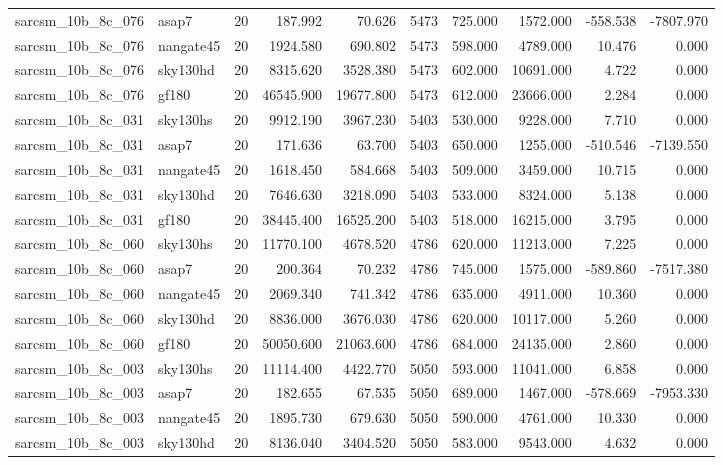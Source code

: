 \begin{tabular}{llrrrrrrrr}
sarcsm\_10b\_8c\_076 & asap7 & 20 & 187.992 & 70.626 & 5473 & 725.000 & 1572.000 & -558.538 & -7807.970 \\
sarcsm\_10b\_8c\_076 & nangate45 & 20 & 1924.580 & 690.802 & 5473 & 598.000 & 4789.000 & 10.476 & 0.000 \\
sarcsm\_10b\_8c\_076 & sky130hd & 20 & 8315.620 & 3528.380 & 5473 & 602.000 & 10691.000 & 4.722 & 0.000 \\
sarcsm\_10b\_8c\_076 & gf180 & 20 & 46545.900 & 19677.800 & 5473 & 612.000 & 23666.000 & 2.284 & 0.000 \\
sarcsm\_10b\_8c\_031 & sky130hs & 20 & 9912.190 & 3967.230 & 5403 & 530.000 & 9228.000 & 7.710 & 0.000 \\
sarcsm\_10b\_8c\_031 & asap7 & 20 & 171.636 & 63.700 & 5403 & 650.000 & 1255.000 & -510.546 & -7139.550 \\
sarcsm\_10b\_8c\_031 & nangate45 & 20 & 1618.450 & 584.668 & 5403 & 509.000 & 3459.000 & 10.715 & 0.000 \\
sarcsm\_10b\_8c\_031 & sky130hd & 20 & 7646.630 & 3218.090 & 5403 & 533.000 & 8324.000 & 5.138 & 0.000 \\
sarcsm\_10b\_8c\_031 & gf180 & 20 & 38445.400 & 16525.200 & 5403 & 518.000 & 16215.000 & 3.795 & 0.000 \\
sarcsm\_10b\_8c\_060 & sky130hs & 20 & 11770.100 & 4678.520 & 4786 & 620.000 & 11213.000 & 7.225 & 0.000 \\
sarcsm\_10b\_8c\_060 & asap7 & 20 & 200.364 & 70.232 & 4786 & 745.000 & 1575.000 & -589.860 & -7517.380 \\
sarcsm\_10b\_8c\_060 & nangate45 & 20 & 2069.340 & 741.342 & 4786 & 635.000 & 4911.000 & 10.360 & 0.000 \\
sarcsm\_10b\_8c\_060 & sky130hd & 20 & 8836.000 & 3676.030 & 4786 & 620.000 & 10117.000 & 5.260 & 0.000 \\
sarcsm\_10b\_8c\_060 & gf180 & 20 & 50050.600 & 21063.600 & 4786 & 684.000 & 24135.000 & 2.860 & 0.000 \\
sarcsm\_10b\_8c\_003 & sky130hs & 20 & 11114.400 & 4422.770 & 5050 & 593.000 & 11041.000 & 6.858 & 0.000 \\
sarcsm\_10b\_8c\_003 & asap7 & 20 & 182.655 & 67.535 & 5050 & 689.000 & 1467.000 & -578.669 & -7953.330 \\
sarcsm\_10b\_8c\_003 & nangate45 & 20 & 1895.730 & 679.630 & 5050 & 590.000 & 4761.000 & 10.330 & 0.000 \\
sarcsm\_10b\_8c\_003 & sky130hd & 20 & 8136.040 & 3404.520 & 5050 & 583.000 & 9543.000 & 4.632 & 0.000 \\

\end{tabular}
